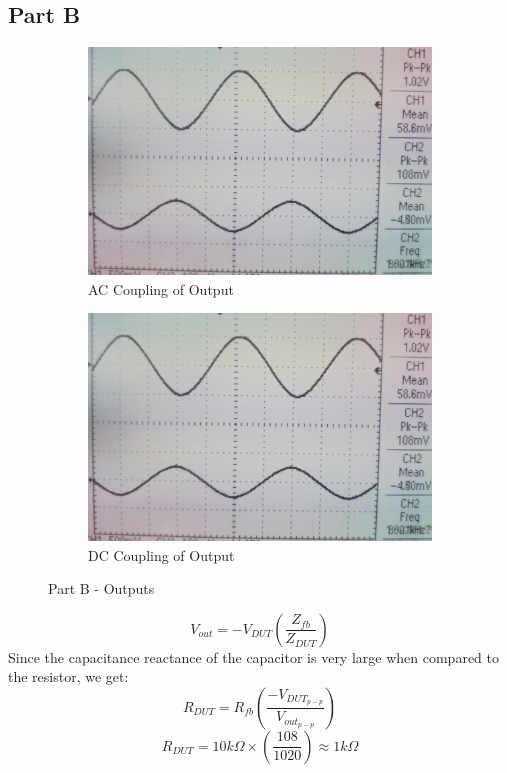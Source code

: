 \documentclass[12pt]{article}
\begin{document}
\subsection{Part B}
\begin{figure}[H]
	\begin{subfigure}[b]{0.5\linewidth}
		\centering
		\includegraphics[width = \linewidth, trim = {0 0 0 0}, clip]{PartB_AC.jpg}
		\caption{AC Coupling of Output}
	\end{subfigure}
	\begin{subfigure}[b]{0.5\linewidth}
		\centering
		\includegraphics[width = \linewidth, trim = {0 0 0 0}, clip]{PartB_AC.jpg}
		\caption{DC Coupling of Output}
	\end{subfigure}
	\caption{Part B - Outputs}
\end{figure}
\[ V_{out} = -V_{DUT}\left( \frac{Z_{fb}}{Z_{DUT}} \right) \] Since the capacitance reactance of the capacitor is very large when compared to the resistor, we get: \[ R_{DUT} = R_{fb}\left( \frac{-V_{DUT_{p-p}}}{V_{out_{p-p}}} \right) \] \[ R_{DUT} = 10 k\Omega \times \left( \frac{108}{1020} \right) \approx 1k\Omega \]
\end{document}
